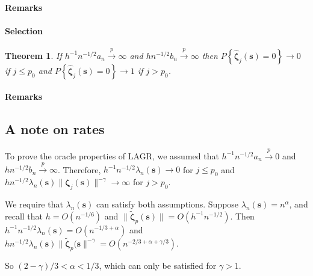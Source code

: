\documentclass[authoryear, review, 11pt]{elsarticle}
\newtheorem{theorem}{Theorem}[section]
\begin{document}
        \paragraph{Remarks}


        \paragraph{Selection}
        \begin{theorem} \label{theorem:selection}  
            If $h^{-1} n^{-1/2} a_n \xrightarrow{p} \infty$ and $h n^{-1/2} b_n \xrightarrow{p} \infty$ then $P \left\{ \hat{\bm{\zeta}}_j (\bm{s}) = 0 \right\} \to 0$ if $j \le p_0$ and $P \left\{ \hat{\bm{\zeta}}_j (\bm{s}) = 0 \right\} \to 1$ if $j > p_0$.
        \end{theorem}

        \paragraph{Remarks}

        \subsection{A note on rates}
        To prove the oracle properties of LAGR, we assumed that $h^{-1} n^{-1/2} a_n \xrightarrow{p} 0$ and $h n^{-1/2} b_n \xrightarrow{p} \infty$. Therefore, $h^{-1} n^{-1/2} \lambda_n(\bm{s})  \to 0$ for $j \le p_0$ and $h n^{-1/2} \lambda_n(\bm{s}) \| \bm{\zeta}_j(\bm{s}) \|^{-\gamma} \to \infty$ for $j > p_0$.
        
        We require that $\lambda_n(\bm{s})$ can satisfy both assumptions. Suppose $\lambda_n(\bm{s}) = n^{\alpha}$, and recall that $h = O(n^{-1/6})$ and $ \| \tilde{\bm{\zeta}}_p(\bm{s}) \| = O(h^{-1} n^{-1/2})$. Then $h^{-1} n^{-1/2} \lambda_n(\bm{s}) = O(n^{-1/3 + \alpha})$ and $h n^{-1/2} \lambda_n(\bm{s})  \| \tilde{\bm{\zeta}}_p(\bm{s} \|^{-\gamma} = O(n^{-2/3 + \alpha + \gamma/3})$.
        
        So $ (2 - \gamma)/3 < \alpha < 1/3 $, which can only be satisfied for $\gamma > 1$.

\appendix
\end{document}
